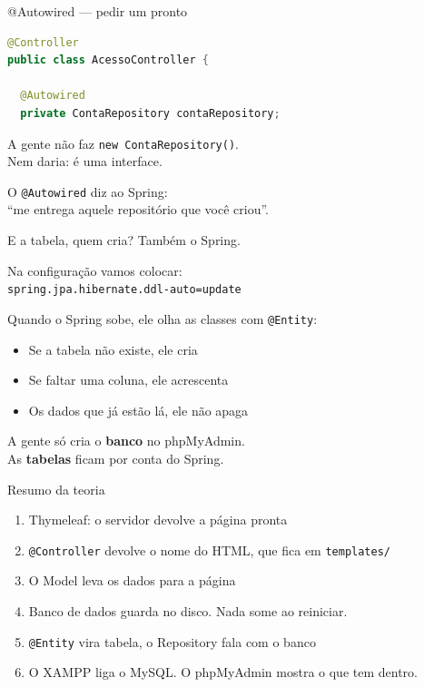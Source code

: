 \documentclass[aspectratio=169,11pt]{beamer}
\begin{document}
\begin{frame}[fragile]{@Autowired --- pedir um pronto}
\begin{lstlisting}[language=Java,basicstyle=\ttfamily\footnotesize]
@Controller
public class AcessoController {

  @Autowired
  private ContaRepository contaRepository;
\end{lstlisting}

  \vspace{0.4em}
  A gente não faz \texttt{new ContaRepository()}.\\
  Nem daria: é uma interface.

  \vspace{0.4em}
  O \texttt{@Autowired} diz ao Spring:\\
  ``me entrega aquele repositório que você criou''.
\end{frame}

\begin{frame}{E a tabela, quem cria?}
  Também o Spring.

  \vspace{0.5em}
  Na configuração vamos colocar:\\
  \texttt{spring.jpa.hibernate.ddl-auto=update}

  \vspace{0.5em}
  Quando o Spring sobe, ele olha as classes com \texttt{@Entity}:
  \begin{itemize}
    \item Se a tabela não existe, ele cria
    \item Se faltar uma coluna, ele acrescenta
    \item Os dados que já estão lá, ele não apaga
  \end{itemize}

  \vspace{0.5em}
  A gente só cria o \textbf{banco} no phpMyAdmin.\\
  As \textbf{tabelas} ficam por conta do Spring.
\end{frame}

\begin{frame}{Resumo da teoria}
  \begin{enumerate}
    \item Thymeleaf: o servidor devolve a página pronta
    \item \texttt{@Controller} devolve o nome do HTML, que fica em \texttt{templates/}
    \item O Model leva os dados para a página
    \item Banco de dados guarda no disco. Nada some ao reiniciar.
    \item \texttt{@Entity} vira tabela, o Repository fala com o banco
    \item O XAMPP liga o MySQL. O phpMyAdmin mostra o que tem dentro.
  \end{enumerate}
\end{frame}
\end{document}

